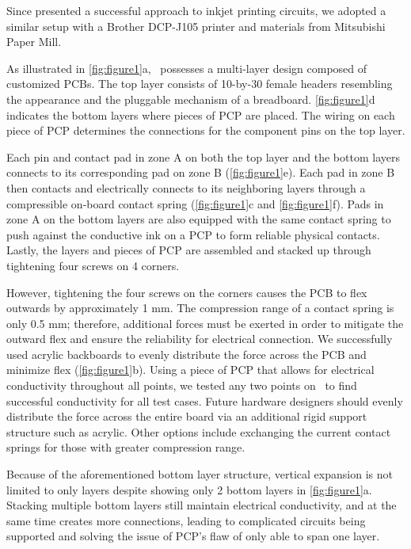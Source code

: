 Since \cite{Instant_Inkjet_Circuits} presented a successful approach to inkjet printing circuits, we adopted a similar setup with a Brother DCP-J105 printer and materials from Mitsubishi Paper Mill.

As illustrated in \autoref{fig:figure1}a, \papertitle\ possesses a multi-layer design composed of customized PCBs. The top layer consists of 10-by-30 female headers resembling the appearance and the pluggable mechanism of a breadboard. \autoref{fig:figure1}d indicates the bottom layers where pieces of PCP are placed. The wiring on each piece of PCP determines the connections for the component pins on the top layer. 

Each pin and contact pad in zone A on both the top layer and the bottom layers connects to its corresponding pad on zone B (\autoref{fig:figure1}e). Each pad in zone B then contacts and electrically connects to its neighboring layers through a compressible on-board contact spring (\autoref{fig:figure1}c and \autoref{fig:figure1}f). Pads in zone A on the bottom layers are also equipped with the same contact spring to push against the conductive ink on a PCP to form reliable physical contacts. Lastly, the layers and pieces of PCP are assembled and stacked up through tightening four screws on 4 corners.

However, tightening the four screws on the corners causes the PCB to flex outwards by approximately 1 mm. The compression range of a contact spring is only 0.5 mm; therefore, additional forces must be exerted in order to mitigate the outward flex and ensure the reliability for electrical connection. We successfully used acrylic backboards to evenly distribute the force across the PCB and minimize flex (\autoref{fig:figure1}b). Using a piece of PCP that allows for electrical conductivity throughout all points, we tested any two points on \papertitle\ to find successful conductivity for all test cases. Future hardware designers should evenly distribute the force across the entire board via an additional rigid support structure such as acrylic. Other options include exchanging the current contact springs for those with greater compression range.

Because of the aforementioned bottom layer structure, vertical expansion is not limited to only  layers despite showing only 2 bottom layers in \autoref{fig:figure1}a. Stacking multiple bottom layers still maintain electrical conductivity, and at the same time creates more connections, leading to complicated circuits being supported and solving the issue of PCP's flaw of only able to span one layer.

